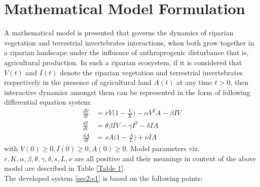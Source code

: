 \documentclass[12pt]{article}
\numberwithin{equation}{section}
\begin{document}
\section{Mathematical Model Formulation}
A mathematical model is presented that governs the dynamics of riparian vegetation and terrestrial invertebrates interactions, when both grow together in a riparian landscape under the influence of anthroprogenic disturbance that is, agricultural production. In such a riparian ecosystem, if it is considered that $V(t)$ and $I(t)$ denote the riparian vegetation and terrestrial invertebrates respectively in the presence of agricultural land $A(t)$ at any time $t>0$, then interactive dynamics amongst them can be represented in the form of following differential equation system:
\begin{subequations}\label{sec2:e1}
	\begin{align}
	\frac{dV}{dt}&=rV\bigg(1-\frac{V}{K}\bigg)-\alpha V^2A -\beta IV\\
	\frac{dI}{dt}&=\theta \beta IV -\gamma I^2 - \delta IA\\
	\frac{dA}{dt}&= sA\bigg(1-\frac{A}{L}\bigg)+\nu IA
	\end{align}
\end{subequations}
with $V(0) \geq 0, I(0)\geq 0, A(0)\geq 0$. Model parameters viz. $r, K, \alpha, \beta, \theta, \gamma, \delta, s, L, \nu$ are all positive and their meanings in context of the above model are described in Table \ref{Table 1}.  \\
The developed system \eqref{sec2:e1} is based on the following points:
\end{document}
